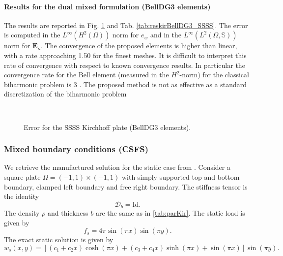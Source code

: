 \paragraph{Results for the dual mixed formulation (BellDG3 elements)}
The results are reported in Fig. \ref{fig:errorBellDG3_SSSS} and Tab. \ref{tab:reskirBellDG3_SSSS}. The error is computed in the $L^\infty (H^2(\Omega))$ norm for $e_w$ and in the $L^\infty (L^2(\Omega, \mathbb{S}))$ norm for $\bm{E}_\kappa$. The convergence of the proposed elements is higher than linear, with a rate approaching 1.50 for the finest meshes. It is difficult to interpret this rate of convergence with respect to known convergence results. In particular the convergence rate for the Bell element (measured in the $H^2$-norm) for the classical biharmonic problem is 3 \cite{ciarlet1988mathematical}. The proposed method is not as effective as a standard discretization of the biharmonic problem


\begin{figure}[htbp]%
	\centering
	\hspace{8pt}%
	 \\
	\caption{Error for the SSSS Kirchhoff plate (BellDG3 elements).}%
	\label{fig:errorBellDG3_SSSS}%
\end{figure}


\subsubsection{Mixed boundary conditions (CSFS)}

We retrieve the manufactured solution for the static case from \cite{rafetseder2018siam}. Consider a square plate $\Omega = (-1,1)\times (-1,1)$ with simply supported top and  bottom boundary, clamped left boundary and free right boundary. The stiffness tensor is the identity
\begin{equation*}
\bm{\mathcal{D}}_b = \mathrm{Id}.
\end{equation*} 
The density $\rho$ and thickness $b$ are the same as in \ref{tab:parKir}.
The static load is given by
\begin{equation*}
f_s = 4 \pi \sin(\pi x) \sin(\pi y).
\end{equation*}
The exact static solution is given by
\begin{equation*}
w_s(x, y) = [(c_1 + c_2 x) \cosh(\pi x) + (c_3 + c_4 x) \sinh(\pi x) + \sin(\pi x)] \sin(\pi y).
\end{equation*}

